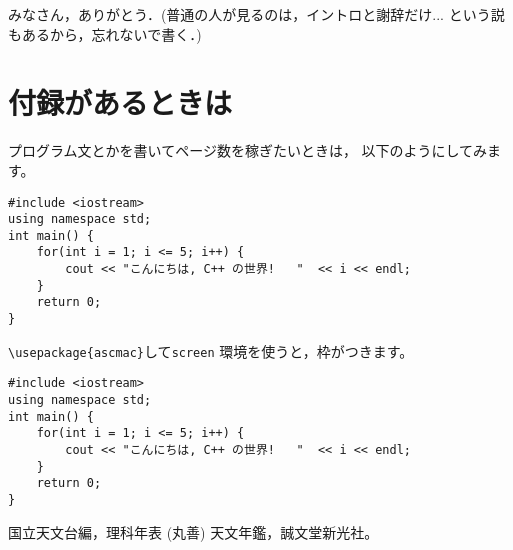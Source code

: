 \documentclass[a4paper,12pt]{jsreport}
\theoremstyle{definition}
\begin{document}
みなさん，ありがとう．(普通の人が見るのは，イントロと謝辞だけ... 
という説もあるから，忘れないで書く．)

\appendix
\chapter{付録があるときは}
プログラム文とかを書いてページ数を稼ぎたいときは，
以下のようにしてみます。

\begin{verbatim}
#include <iostream>
using namespace std;
int main() {  
    for(int i = 1; i <= 5; i++) {
        cout << "こんにちは, C++ の世界!   "  << i << endl;
    }
    return 0;
}
\end{verbatim}
\verb|\usepackage{ascmac}|して\verb|screen| 環境を使うと，枠がつきます。
\begin{screen}
\begin{verbatim}
#include <iostream>
using namespace std;
int main() {  
    for(int i = 1; i <= 5; i++) {
        cout << "こんにちは, C++ の世界!   "  << i << endl;
    }
    return 0;
}
\end{verbatim}
\end{screen}

\begin{thebibliography}{99}
 国立天文台編，理科年表 (丸善)
 天文年鑑，誠文堂新光社。
\end{thebibliography}
\end{document}
